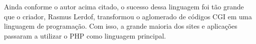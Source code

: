 Ainda conforme o autor acima citado, o sucesso dessa linguagem foi tão grande que o criador, Rasmus Lerdof, transformou o aglomerado de códigos CGI em uma linguagem de programação. Com isso, a grande maioria dos sites e aplicações passaram a utilizar o PHP como linguagem principal.

